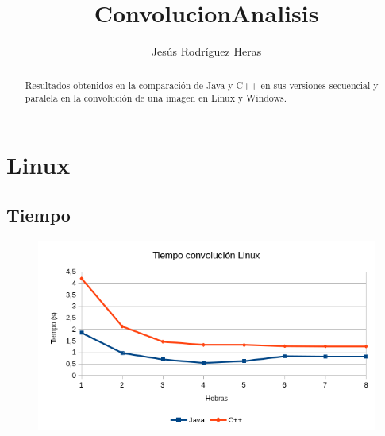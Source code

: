 \documentclass[12pt,letterpaper]{article}
\title{ConvolucionAnalisis}
\author{Jesús Rodríguez Heras}
\begin{document}
	
	\maketitle
	\begin{abstract} %
		\begin{center}
			Resultados obtenidos en la comparación de Java y C++ en sus versiones secuencial y paralela en la convolución de una imagen en Linux y Windows.
		\end{center}
	\end{abstract}
	\thispagestyle{empty}
	\newpage
	
	
	
	
	
	\lstset{language=bash, numbers=left, numberstyle=\tiny, numbersep=10pt, firstnumber=1, stepnumber=1, basicstyle=\small\ttfamily, tabsize=1, extendedchars=true, inputencoding=latin1}

\section{Linux}
\subsection{Tiempo}
\begin{figure}[h]
	\centering
	\includegraphics[scale=0.8]{TiempoLinux.png}
\end{figure}
\end{document}
